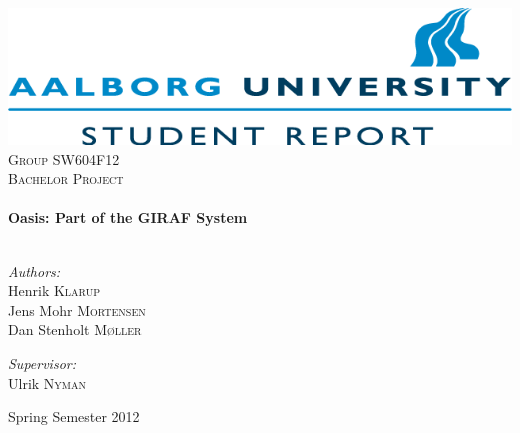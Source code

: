 \begin{titlepage}

\begin{center}

\includegraphics[width=\textwidth]{Images/aaulogo_en}\\[1cm]    

\textsc{\LARGE Group SW604F12}\\[1.5cm]

\textsc{\Large Bachelor Project}\\[0.5cm]


\HRule \\[0.4cm]
{ \huge \bfseries Oasis: Part of the GIRAF System}\\[0.4cm]

\HRule \\[1.5cm]

\begin{minipage}{0.4\textwidth}
\begin{flushleft} \large
\vspace{1.25cm}
\emph{Authors:}\\
Henrik \textsc{Klarup} \\
Jens Mohr \textsc{Mortensen} \\
Dan Stenholt \textsc{M\o{}ller}
\end{flushleft}
\end{minipage}
\begin{minipage}{0.4\textwidth}
\begin{flushright} \large
\emph{Supervisor:} \\
Ulrik \textsc{Nyman}
\end{flushright}
\end{minipage}

\vfill

{\large Spring Semester 2012}

\end{center}

\end{titlepage}
